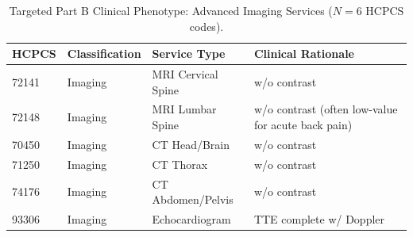 \begin{table}[htbp]
\caption{Targeted Part B Clinical Phenotype: Advanced Imaging Services ($N=6$ HCPCS codes).}
\label{tab:imaging}
\begin{tabular}{llp{3cm}p{4cm}}
\toprule
\rowcolor{gray!10}
HCPCS & Classification & Service Type & Clinical Rationale \\
\midrule
72141 & Imaging & MRI Cervical Spine & w/o contrast \\
72148 & Imaging & MRI Lumbar Spine & w/o contrast (often low-value for acute back pain) \\
70450 & Imaging & CT Head/Brain & w/o contrast \\
71250 & Imaging & CT Thorax & w/o contrast \\
74176 & Imaging & CT Abdomen/Pelvis & w/o contrast \\
93306 & Imaging & Echocardiogram & TTE complete w/ Doppler \\
\bottomrule
\end{tabular}
\end{table}
